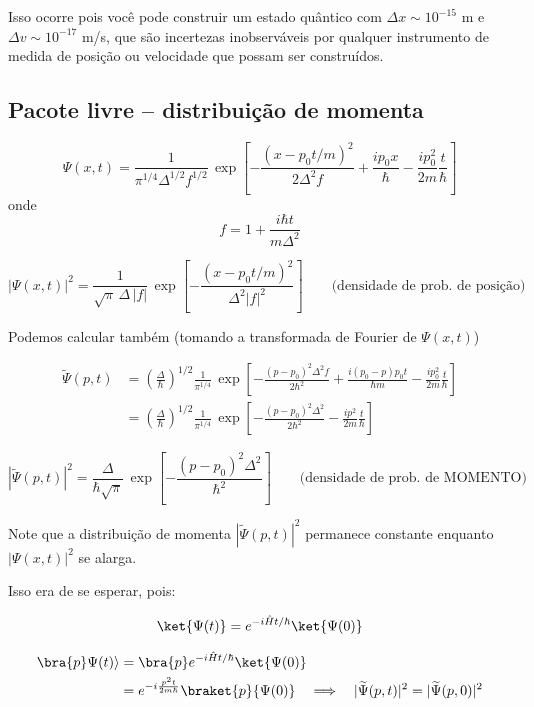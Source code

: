 Isso ocorre pois você pode construir um estado quântico com $\Delta x \sim 10^{-15}$ m e $\Delta v \sim 10^{-17}$ m/s, que são incertezas inobserváveis por qualquer instrumento de medida de posição ou velocidade que possam ser construídos.

\subsection*{Pacote livre -- distribuição de momenta}

\begin{equation}
    \Psi(x,t) = \frac{1}{\pi^{1/4}\Delta^{1/2}f^{1/2}}\, \exp\left[-\frac{(x-p_0t/m)^2}{2\Delta^2 f} + \frac{ip_0 x}{\hbar} - \frac{ip_0^2}{2m}\frac{t}{\hbar}\right]
\label{eq:aula14_psi_xt_compacta}
\end{equation}
onde
\begin{equation}
    f = 1 + \frac{i\hbar t}{m\Delta^2}
\label{eq:aula14_f_def}
\end{equation}

\begin{equation}
    |\Psi(x,t)|^2 = \frac{1}{\sqrt{\pi}\,\Delta\,|f|}\, \exp\left[-\frac{(x-p_0t/m)^2}{\Delta^2|f|^2}\right] \qquad \text{(densidade de prob. de posição)}
\label{eq:aula14_densidade_prob_f}
\end{equation}

Podemos calcular também (tomando a transformada de Fourier de $\Psi(x,t)$)

\begin{align}
    \widetilde{\Psi}(p,t) &= \left(\frac{\Delta}{\hbar}\right)^{1/2} \frac{1}{\pi^{1/4}}\, \exp\left[-\frac{(p-p_0)^2\Delta^2 f}{2\hbar^2} + \frac{i(p_0-p)p_0t}{\hbar m} - \frac{ip_0^2}{2m}\frac{t}{\hbar}\right] \label{eq:aula14_fourier_p_passo1} \\
    &= \left(\frac{\Delta}{\hbar}\right)^{1/2} \frac{1}{\pi^{1/4}}\, \exp\left[-\frac{(p-p_0)^2\Delta^2}{2\hbar^2} - \frac{ip^2}{2m}\frac{t}{\hbar}\right] \label{eq:aula14_fourier_p_passo2}
\end{align}

\begin{equation}
    |\widetilde{\Psi}(p,t)|^2 = \frac{\Delta}{\hbar\sqrt{\pi}}\, \exp\left[-\frac{(p-p_0)^2\Delta^2}{\hbar^2}\right] \qquad \text{(densidade de prob. de MOMENTO)}
\label{eq:aula14_densidade_prob_momento}
\end{equation}

Note que a distribuição de momenta $|\widetilde{\Psi}(p,t)|^2$ permanece constante enquanto $|\Psi(x,t)|^2$ se alarga.

Isso era de se esperar, pois:

\begin{equation}
    \ket{\Psi(t)} = e^{-i\hat{H}t/\hbar}\ket{\Psi(0)}
\label{eq:aula14_psi_t_op}
\end{equation}

\begin{align}
    \bra{p}\Psi(t)\rangle &= \bra{p}e^{-i\hat{H}t/\hbar}\ket{\Psi(0)} \notag \\
    &= e^{-i\frac{p^2t}{2m\hbar}}\braket{p}{\Psi(0)} \quad \Longrightarrow \quad |\widetilde{\Psi}(p,t)|^2 = |\widetilde{\Psi}(p,0)|^2
\label{eq:aula14_invariancia_momento}
\end{align}
